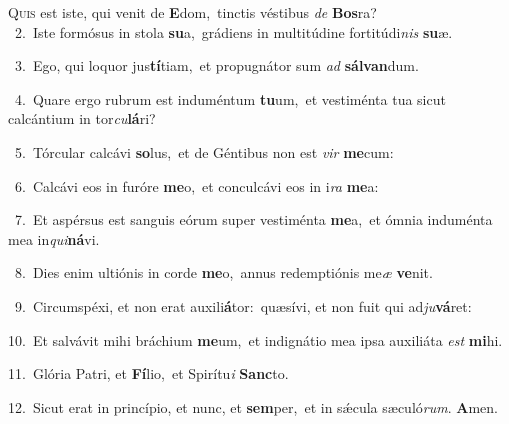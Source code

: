 \lettrine{\initial\textcolor{\initialcolor}{Q}}{uis} est iste, qui venit de \textbf{E}\-dom,~\star tinctis véstibus \textit{de} \textbf{Bos}\-ra?\\
{\numbfont\textcolor{\numbcolor}{~2.}}~Iste formósus in stola \textbf{su}\-a,~\star grádiens in multitúdine fortitúdi\textit{nis} \textbf{su}\-æ.\par
{\numbfont\textcolor{\numbcolor}{~3.}}~Ego, qui loquor jus\-\textbf{tí}\-tiam,~\star et propugnátor sum \textit{ad} \textbf{sál}\-\textbf{van}dum.\par
{\numbfont\textcolor{\numbcolor}{~4.}}~Quare ergo rubrum est induméntum \textbf{tu}\-um,~\star et vestiménta tua sicut calcántium in tor\-\textit{cu}\-\textbf{lá}ri?\par
{\numbfont\textcolor{\numbcolor}{~5.}}~Tórcular calcávi \textbf{so}\-lus,~\star et de Géntibus non est \textit{vir} \textbf{me}\-cum:\par
{\numbfont\textcolor{\numbcolor}{~6.}}~Calcávi eos in furóre \textbf{me}\-o,~\star et conculcávi eos in i\textit{ra} \textbf{me}\-a:\par
{\numbfont\textcolor{\numbcolor}{~7.}}~Et aspérsus est sanguis eórum super vestiménta \textbf{me}\-a,~\star et ómnia induménta mea in\-\textit{qui}\-\textbf{ná}vi.\par
{\numbfont\textcolor{\numbcolor}{~8.}}~Dies enim ultiónis in corde \textbf{me}\-o,~\star annus redemptiónis me\textit{æ} \textbf{ve}\-nit.\par
{\numbfont\textcolor{\numbcolor}{~9.}}~Circumspéxi, et non erat auxili\-\textbf{á}\-tor:~\star quæsívi, et non fuit qui ad\-\textit{ju}\-\textbf{vá}ret:\par
{\numbfont\textcolor{\numbcolor}{10.}}~Et salvávit mihi bráchium \textbf{me}\-um,~\star et indignátio mea ipsa auxiliáta \textit{est} \textbf{mi}\-hi.\par
{\numbfont\textcolor{\numbcolor}{11.}}~Glória Patri, et \textbf{Fí}\-lio,~\star et Spirítu\textit{i} \textbf{Sanc}\-to.\par
{\numbfont\textcolor{\numbcolor}{12.}}~Sicut erat in princípio, et nunc, et \textbf{sem}\-per,~\star et in sǽcula sæculó\-\textit{rum}\-. \textbf{A}\-men.\par
